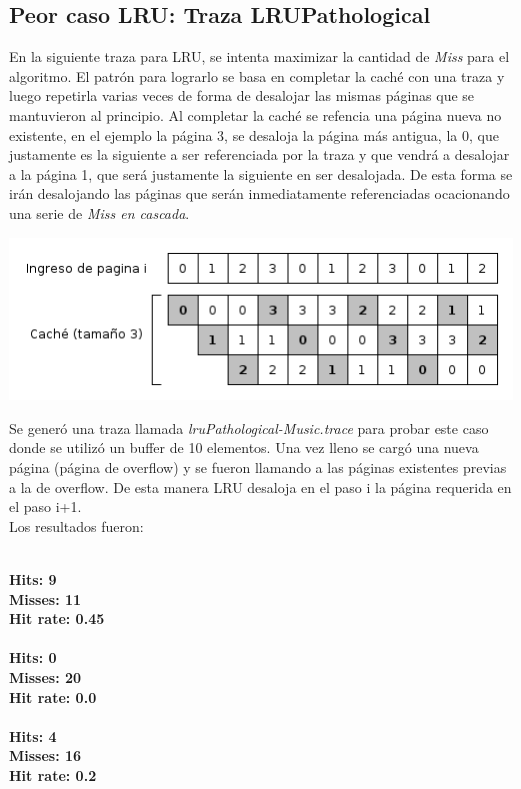 \documentclass[11pt, a4paper, spanish]{article}
\begin{document}
\subsection{ Peor caso LRU: Traza LRUPathological} 
	En la siguiente traza para LRU, se intenta maximizar la cantidad de \textit{Miss} para el algoritmo. El patr\'on para lograrlo se basa
en completar la cach\'e con una traza y luego repetirla varias veces de forma de desalojar las mismas p\'aginas que se mantuvieron al principio.
Al completar la cach\'e se refencia una p\'agina nueva no existente, en el ejemplo la p\'agina 3, se desaloja la p\'agina m\'as antigua, la 0, que 
justamente es la siguiente a ser referenciada por la traza y que vendr\'a a desalojar a la p\'agina 1, que ser\'a justamente la siguiente en ser 
desalojada. De esta forma se ir\'an desalojando las p\'aginas que ser\'an inmediatamente referenciadas ocacionando una serie de \textit{Miss en cascada}. 

	\begin{center}
	\includegraphics[scale=0.65]{diagramas/LRUPathological.png}\\
	\end{center}

Se gener\'o una traza llamada \textit{lruPathological-Music.trace} para probar este caso donde se utiliz\'o un buffer de 10 elementos. Una vez lleno se carg\'o una nueva p\'agina (p\'agina de overflow) y se fueron llamando a las p\'aginas existentes previas a la de overflow. De esta manera LRU desaloja en el paso i la p\'agina requerida en el paso i+1.\\

Los resultados fueron:\\

\begin{multicols}{3}

\\
\textbf{Hits: 9}\\
\textbf{Misses: 11}\\
\textbf{Hit rate: 0.45}\\

\\
\textbf{Hits: 0}\\
\textbf{Misses: 20}\\
\textbf{Hit rate: 0.0}\\

\\
\textbf{Hits: 4}\\
\textbf{Misses: 16}\\
\textbf{Hit rate: 0.2}\\

\end{multicols}
\end{document}

